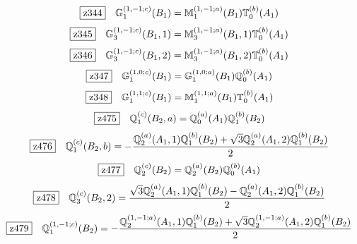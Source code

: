 \documentclass[fleqn,10pt,landscape]{jsarticle}
\begin{document}
\begin{dmath*}
\hspace*{3mm}\fbox{z344}\quad \mathbb{G}_{1}^{(1,-1;c)}(B_{1})=\mathbb{M}_{1}^{(1,-1;a)}(B_{1}) \mathbb{T}_{0}^{(b)}(A_{1})
\end{dmath*}
\begin{dmath*}
\hspace*{3mm}\fbox{z345}\quad \mathbb{G}_{3}^{(1,-1;c)}(B_{1},1)=\mathbb{M}_{3}^{(1,-1;a)}(B_{1},1) \mathbb{T}_{0}^{(b)}(A_{1})
\end{dmath*}
\begin{dmath*}
\hspace*{3mm}\fbox{z346}\quad \mathbb{G}_{3}^{(1,-1;c)}(B_{1},2)=\mathbb{M}_{3}^{(1,-1;a)}(B_{1},2) \mathbb{T}_{0}^{(b)}(A_{1})
\end{dmath*}
\begin{dmath*}
\hspace*{3mm}\fbox{z347}\quad \mathbb{G}_{1}^{(1,0;c)}(B_{1})=\mathbb{G}_{1}^{(1,0;a)}(B_{1}) \mathbb{Q}_{0}^{(b)}(A_{1})
\end{dmath*}
\begin{dmath*}
\hspace*{3mm}\fbox{z348}\quad \mathbb{G}_{1}^{(1,1;c)}(B_{1})=\mathbb{M}_{1}^{(1,1;a)}(B_{1}) \mathbb{T}_{0}^{(b)}(A_{1})
\end{dmath*}
\begin{dmath*}
\hspace*{3mm}\fbox{z475}\quad \mathbb{Q}_{1}^{(c)}(B_{2},a)=\mathbb{Q}_{0}^{(a)}(A_{1}) \mathbb{Q}_{1}^{(b)}(B_{2})
\end{dmath*}
\begin{dmath*}
\hspace*{3mm}\fbox{z476}\quad \mathbb{Q}_{1}^{(c)}(B_{2},b)=- \frac{\mathbb{Q}_{2}^{(a)}(A_{1},1) \mathbb{Q}_{1}^{(b)}(B_{2}) + \sqrt{3} \mathbb{Q}_{2}^{(a)}(A_{1},2) \mathbb{Q}_{1}^{(b)}(B_{2})}{2}
\end{dmath*}
\begin{dmath*}
\hspace*{3mm}\fbox{z477}\quad \mathbb{Q}_{2}^{(c)}(B_{2})=\mathbb{Q}_{2}^{(a)}(B_{2}) \mathbb{Q}_{0}^{(b)}(A_{1})
\end{dmath*}
\begin{dmath*}
\hspace*{3mm}\fbox{z478}\quad \mathbb{Q}_{3}^{(c)}(B_{2},2)=\frac{\sqrt{3} \mathbb{Q}_{2}^{(a)}(A_{1},1) \mathbb{Q}_{1}^{(b)}(B_{2}) - \mathbb{Q}_{2}^{(a)}(A_{1},2) \mathbb{Q}_{1}^{(b)}(B_{2})}{2}
\end{dmath*}
\begin{dmath*}
\hspace*{3mm}\fbox{z479}\quad \mathbb{Q}_{1}^{(1,-1;c)}(B_{2})=- \frac{\mathbb{Q}_{2}^{(1,-1;a)}(A_{1},1) \mathbb{Q}_{1}^{(b)}(B_{2}) + \sqrt{3} \mathbb{Q}_{2}^{(1,-1;a)}(A_{1},2) \mathbb{Q}_{1}^{(b)}(B_{2})}{2}
\end{dmath*}
\end{document}
